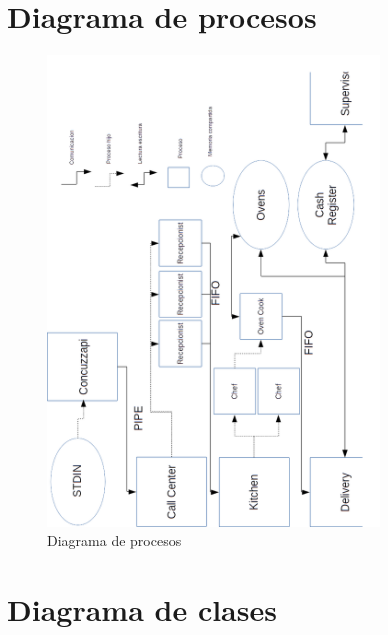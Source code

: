 \documentclass[11pt,spanish,a4paper,openany,notitlepage]{article}
\begin{document}
\newpage

\section{Diagrama de procesos}

\begin{figure}[h]
\begin{center}
\includegraphics[width=250pt]{./informe/Modelo-de-procesos.png}
\caption{Diagrama de procesos}
\end{center}
\end{figure}

\newpage

\section{Diagrama de clases}
\end{document}
